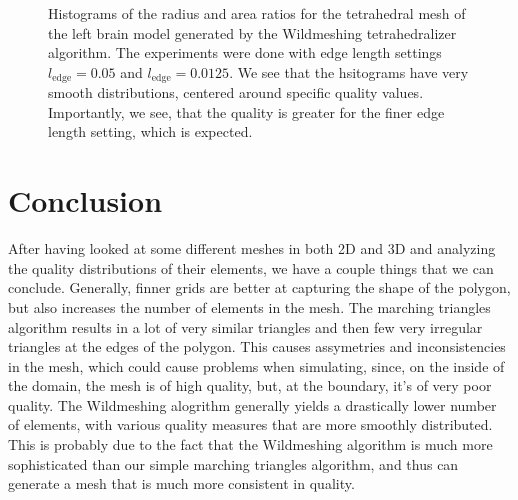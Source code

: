 \documentclass[acmtog]{acmart}
\begin{document}
\begin{figure}[H]
\begin{subfigure}{0.22\textwidth}
  \end{subfigure}
  \caption{Histograms of the radius and area ratios for the tetrahedral mesh of the left brain model generated by the Wildmeshing tetrahedralizer algorithm.
    The experiments were done with edge length settings $l_\mathrm{edge}  = 0.05$ and $l_\mathrm{edge}  = 0.0125$.
    We see that the hsitograms have very smooth distributions, centered around specific quality values.
    Importantly, we see, that the quality is greater for the finer edge length setting, which is expected.}
\end{figure}

\section{Conclusion}
After having looked at some different meshes in both 2D and 3D and analyzing
the quality distributions of their elements, we have a couple things that we
can conclude. Generally, finner grids are better at capturing the shape of the
polygon, but also increases the number of elements in the mesh. The marching
triangles algorithm results in a lot of very similar triangles and then few
very irregular triangles at the edges of the polygon. This causes assymetries
and inconsistencies in the mesh, which could cause problems when simulating,
since, on the inside of the domain, the mesh is of high quality, but, at the
boundary, it's of very poor quality. The Wildmeshing alogrithm generally yields
a drastically lower number of elements, with various quality measures that are
more smoothly distributed. This is probably due to the fact that the
Wildmeshing algorithm is much more sophisticated than our simple marching
triangles algorithm, and thus can generate a mesh that is much more consistent
in quality.
\end{document}
